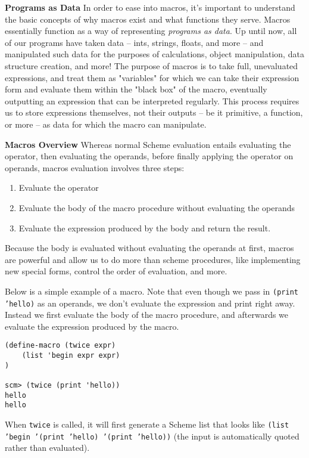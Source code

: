 \textbf{Programs as Data} 
In order to ease into macros, it's important to understand the basic concepts of why macros exist and what functions they serve.
Macros essentially function as a way of representing \textit{programs as data}.
Up until now, all of our programs have taken data -- ints, strings, floats, and more -- and manipulated such data for the purposes of calculations, object manipulation, data structure creation, and more!
The purpose of macros is to take full, unevaluated expressions, and treat them as "variables" for which we can take their expression form and evaluate them within the "black box" of the macro, eventually outputting an expression that can be interpreted regularly.
This process requires us to store expressions themselves, not their outputs -- be it primitive, a function, or more -- as data for which the macro can manipulate.

\newpage
\textbf{Macros Overview} Whereas normal Scheme evaluation entails evaluating the operator, then evaluating the operands, before finally applying the operator on operands, macros evaluation involves three steps:

\begin{enumerate}[1.]
\item Evaluate the operator
\item Evaluate the body of the macro procedure without evaluating the operands
\item Evaluate the expression produced by the body and return the result.
\end{enumerate}

Because the body is evaluated without evaluating the operands at first, macros are powerful and allow us to do more than scheme procedures, like implementing new special forms, control the order of evaluation, and more. 

Below is a simple example of a macro. Note that even though we pass in \texttt{(print 'hello)} as an operands, we don't evaluate the expression and print right away. Instead we first evaluate the body of the macro procedure, and afterwards we evaluate the expression produced by the macro. 
\vspace{1cm}
\begin{lstlisting}
(define-macro (twice expr)
    (list 'begin expr expr)
)

scm> (twice (print 'hello))
hello
hello
\end{lstlisting}

When \texttt{twice} is called, it will first generate a Scheme list that looks like \texttt{(list 'begin '(print 'hello) '(print 'hello))} (the input is automatically quoted rather than evaluated).

